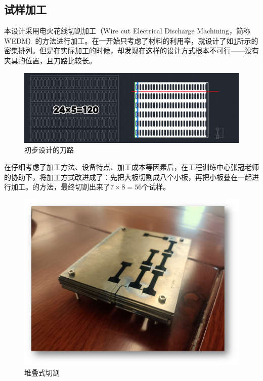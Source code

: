 %
\subsection{试样加工}
本设计采用电火花线切割加工（Wire cut Electrical Discharge Machining，简称WEDM）的方法进行加工。在一开始只考虑了材料的利用率，就设计了如\ref{fig:badway}所示的密集排列。但是在实际加工的时候，却发现在这样的设计方式根本不可行——没有夹具的位置，且刀路比较长。

\begin{figure}[h!]
	\centering
	\includegraphics[width=0.8\linewidth]{pic/刀路初步}
	\caption{初步设计的刀路}
	\label{fig:badway}
\end{figure}


在仔细考虑了加工方法、设备特点、加工成本等因素后，在工程训练中心张冠老师的协助下，将加工方式改进成了：先把大板切割成八个小板，再把小板叠在一起进行加工。的方法，最终切割出来了$ 7\times 8=56 $个试样。
\begin{figure}[h!]
	\centering
	\includegraphics[width=0.7\linewidth]{pic/堆叠式切割}
	\caption{堆叠式切割}
	\label{fig:goodway}
\end{figure}


